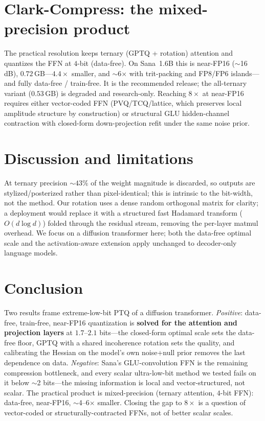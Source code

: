 \documentclass[11pt]{article}
\begin{document}
\section{Clark-Compress: the mixed-precision product}
The practical resolution keeps ternary (GPTQ + rotation) attention and quantizes
the FFN at $4$-bit (data-free). On Sana~1.6B this is near-FP16 ($\sim$16\,dB),
$0.72$\,GB---$4.4\times$ smaller, and $\sim$6$\times$ with trit-packing and FP8/FP6
islands---and fully data-free / train-free. It is the recommended release; the
all-ternary variant ($0.53$\,GB) is degraded and research-only. Reaching $8\times$
at near-FP16 requires either vector-coded FFN (PVQ/TCQ/lattice, which preserves
local amplitude structure by construction) or structural GLU hidden-channel
contraction with closed-form down-projection refit under the same noise prior.

\section{Discussion and limitations}
At ternary precision $\sim\!43\%$ of the weight magnitude is discarded, so outputs
are stylized/posterized rather than pixel-identical; this is intrinsic to the
bit-width, not the method. Our rotation uses a dense random orthogonal matrix for
clarity; a deployment would replace it with a structured fast Hadamard transform
($O(d\log d)$) folded through the residual stream, removing the per-layer matmul
overhead. We focus on a diffusion transformer here; both the data-free optimal
scale and the activation-aware extension apply unchanged to decoder-only language
models.

\section{Conclusion}
Two results frame extreme-low-bit PTQ of a diffusion transformer.
\emph{Positive}: data-free, train-free, near-FP16 quantization is \textbf{solved
for the attention and projection layers} at $1.7$--$2.1$ bits---the closed-form
optimal scale sets the data-free floor, GPTQ with a shared incoherence rotation
sets the quality, and calibrating the Hessian on the model's own noise+null prior
removes the last dependence on data. \emph{Negative}: Sana's GLU-convolution FFN
is the remaining compression bottleneck, and every scalar ultra-low-bit method we
tested fails on it below $\sim$2 bits---the missing information is local and
vector-structured, not scalar. The practical product is mixed-precision
(ternary attention, $4$-bit FFN): data-free, near-FP16, $\sim$4--6$\times$ smaller.
Closing the gap to $8\times$ is a question of vector-coded or structurally-contracted
FFNs, not of better scalar scales.
\end{document}
